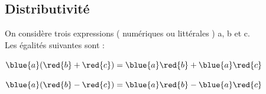 \subsection{Distributivité}
\begin{Propriete}
    On considère trois expressions ( numériques ou littérales ) a, b et c. \\
    Les égalités suivantes sont  :\\
    \begin{minipage}[t]{0.475\textwidth}
        \begin{center}\Large$\blue{a}(\red{b}+\red{c})=\blue{a}\red{b}+\blue{a}\red{c}$\end{center}
    \end{minipage}
    \hfill
    \begin{minipage}[t]{0.475\textwidth}
        \begin{center}\Large$\blue{a}(\red{b}-\red{c})=\blue{a}\red{b}-\blue{a}\red{c}$\end{center}
    \end{minipage} 
\end{Propriete}

